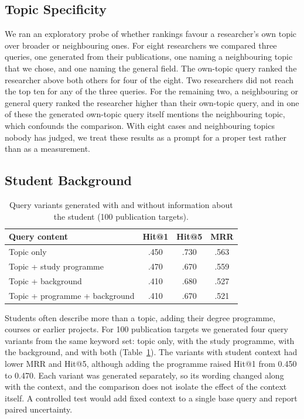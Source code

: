 \documentclass[sigconf,nonacm]{acmart}
\begin{document}
\subsection{Topic Specificity}

We ran an exploratory probe of whether rankings favour a researcher's own topic over broader or neighbouring ones. For eight researchers we compared three queries, one generated from their publications, one naming a neighbouring topic that we chose, and one naming the general field. The own-topic query ranked the researcher above both others for four of the eight. Two researchers did not reach the top ten for any of the three queries. For the remaining two, a neighbouring or general query ranked the researcher higher than their own-topic query, and in one of these the generated own-topic query itself mentions the neighbouring topic, which confounds the comparison. With eight cases and neighbouring topics nobody has judged, we treat these results as a prompt for a proper test rather than as a measurement.

\subsection{Student Background}

\begin{table}[t]
\caption{Query variants generated with and without information about the student (100 publication targets).}
\label{tab:ablation}
\small
\begin{tabular}{lccc}
\toprule
Query content & Hit@1 & Hit@5 & MRR \\
\midrule
Topic only                     & .450 & .730 & .563 \\
Topic + study programme        & .470 & .670 & .559 \\
Topic + background             & .410 & .680 & .527 \\
Topic + programme + background & .410 & .670 & .521 \\
\bottomrule
\end{tabular}
\end{table}

Students often describe more than a topic, adding their degree programme, courses or earlier projects. For 100 publication targets we generated four query variants from the same keyword set: topic only, with the study programme, with the background, and with both (Table~\ref{tab:ablation}). The variants with student context had lower MRR and Hit@5, although adding the programme raised Hit@1 from 0.450 to 0.470. Each variant was generated separately, so its wording changed along with the context, and the comparison does not isolate the effect of the context itself. A controlled test would add fixed context to a single base query and report paired uncertainty.
\end{document}
